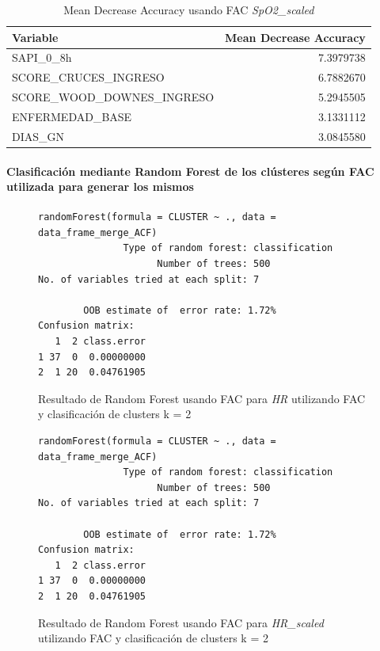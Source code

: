 \begin{table}[H]
    \centering
    \begin{tabular}{lr}
        \toprule
        \textbf{Variable} & \textbf{Mean Decrease Accuracy} \\
        \midrule
        SAPI\_0\_8h & 7.3979738 \\
        SCORE\_CRUCES\_INGRESO & 6.7882670 \\
        SCORE\_WOOD\_DOWNES\_INGRESO & 5.2945505 \\
        ENFERMEDAD\_BASE & 3.1331112 \\
        DIAS\_GN & 3.0845580 \\
        \bottomrule
    \end{tabular}
    \caption{Mean Decrease Accuracy usando FAC \textit{SpO2\_scaled}}
\end{table}


\paragraph{Clasificación {\color{blue}mediante} Random Forest de los clústeres según FAC utilizada para {\color{blue}generar} los mismos} 

\begin{figure}[H]
    \centering
    \begin{lstlisting}[frame=single, basicstyle=\small\ttfamily]
        randomForest(formula = CLUSTER ~ ., data = data_frame_merge_ACF) 
               Type of random forest: classification
                     Number of trees: 500
No. of variables tried at each split: 7

        OOB estimate of  error rate: 1.72%
Confusion matrix:
   1  2 class.error
1 37  0  0.00000000
2  1 20  0.04761905
    \end{lstlisting}
    \caption{Resultado de Random Forest usando FAC para \textit{HR} utilizando FAC y clasificación de clusters k = 2}\label{fig:random_forest_acf_result_RF_1}
\end{figure}
\begin{figure}[H]
    \centering
    \begin{lstlisting}[frame=single, basicstyle=\small\ttfamily]
        randomForest(formula = CLUSTER ~ ., data = data_frame_merge_ACF) 
               Type of random forest: classification
                     Number of trees: 500
No. of variables tried at each split: 7

        OOB estimate of  error rate: 1.72%
Confusion matrix:
   1  2 class.error
1 37  0  0.00000000
2  1 20  0.04761905
    \end{lstlisting}
    \caption{Resultado de Random Forest usando FAC para \textit{HR\_scaled} utilizando FAC y clasificación de clusters k = 2}
    \label{fig:random_forest_acf_result_RF_2}
\end{figure}

